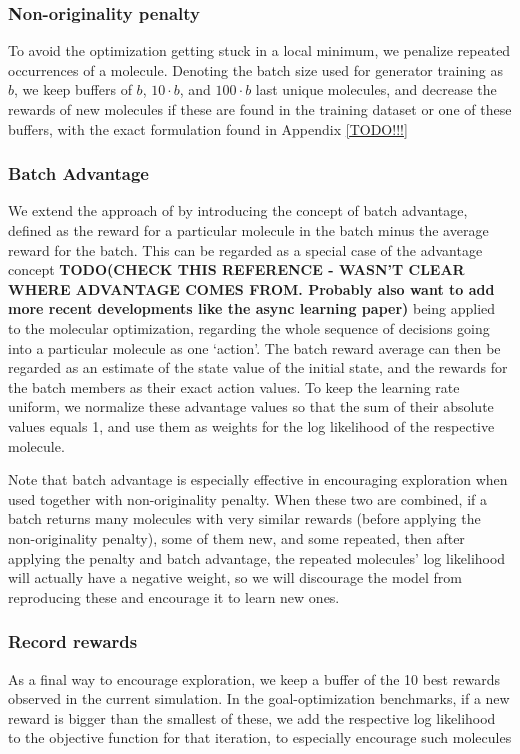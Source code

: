 \documentclass{article}
\newcommand{\TODO}[1]{{\bf TODO(#1)}}
\begin{document}
\subsubsection{Non-originality penalty}
To avoid the optimization getting stuck in a local minimum, we penalize repeated occurrences of a molecule. Denoting the batch size used for generator training as $b$, we keep buffers of $b$, $10\cdot b$, and $100\cdot b$ last unique molecules, and decrease the rewards of new molecules if these are found in the training dataset or one of these buffers, with the exact formulation found in Appendix \ref{TODO!!!}

\subsubsection{Batch Advantage}
We extend the approach of \cite{segler2017} by introducing the concept of batch advantage, defined as the reward for a particular molecule in the batch minus the average reward for the batch. This can be regarded as a special case of the advantage concept \cite{baird1994} \TODO{CHECK THIS REFERENCE - WASN'T CLEAR WHERE ADVANTAGE COMES FROM. Probably also want to add more recent developments like the async learning paper} being applied to the molecular optimization, regarding the whole sequence of decisions going into a particular molecule as one `action'. The batch reward average can then be regarded as an estimate of the state value of the initial state, and the rewards for the batch members as their exact action values. To keep the learning rate uniform, we normalize these advantage values so that the sum of their absolute values equals 1, and use them as weights for the log likelihood of the respective molecule.

Note that batch advantage is especially effective in encouraging exploration when used together with non-originality penalty. When these two are combined, if a batch returns many molecules with very similar rewards (before applying the non-originality penalty), some of them new, and some repeated, then after applying the penalty and batch advantage, the repeated molecules' log likelihood will actually have a negative weight, so we will discourage the model from reproducing these and encourage it to learn new ones.
\subsubsection{Record rewards}
As a final way to encourage exploration, we keep a buffer of the 10 best rewards observed in the current simulation. In the goal-optimization benchmarks, if a new reward is bigger than the smallest of these, we add the respective log likelihood to the objective function for that iteration, to especially encourage such molecules
\end{document}
